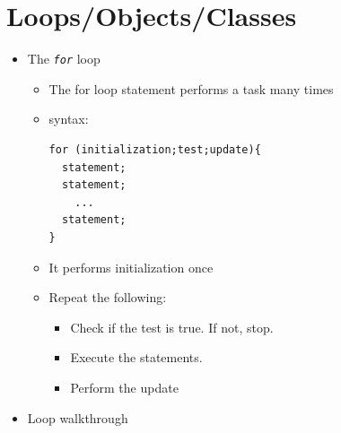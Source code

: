 \documentclass[a4paper]{article}
\newcommand{\inline}[1]{\lstinline!#1!}%
\begin{document}
\section{Loops/Objects/Classes}
    \begin{itemize}
      \item The \textit{\inline{for}} loop
        \begin{itemize}
          \item The for loop statement performs a task many times
          \item syntax:
            \begin{lstlisting}
for (initialization;test;update){
  statement;
  statement;
    ...
  statement;
}
            \end{lstlisting}
            \item It performs initialization once
            \item Repeat the following:
              \begin{itemize}
                \item Check if the test is true. If not, stop.
                \item Execute the statements.
                \item Perform the update
              \end{itemize}
        \end{itemize}
      \item Loop walkthrough  


\end{itemize}
\end{document}
